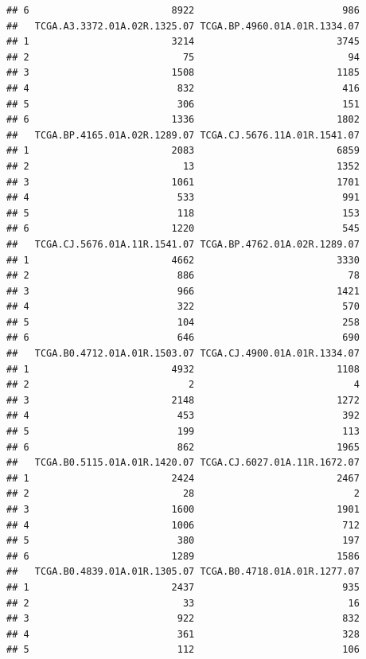 \documentclass[
]{article}
\begin{document}
\begin{verbatim}
## 6                         8922                          986
##   TCGA.A3.3372.01A.02R.1325.07 TCGA.BP.4960.01A.01R.1334.07
## 1                         3214                         3745
## 2                           75                           94
## 3                         1508                         1185
## 4                          832                          416
## 5                          306                          151
## 6                         1336                         1802
##   TCGA.BP.4165.01A.02R.1289.07 TCGA.CJ.5676.11A.01R.1541.07
## 1                         2083                         6859
## 2                           13                         1352
## 3                         1061                         1701
## 4                          533                          991
## 5                          118                          153
## 6                         1220                          545
##   TCGA.CJ.5676.01A.11R.1541.07 TCGA.BP.4762.01A.02R.1289.07
## 1                         4662                         3330
## 2                          886                           78
## 3                          966                         1421
## 4                          322                          570
## 5                          104                          258
## 6                          646                          690
##   TCGA.B0.4712.01A.01R.1503.07 TCGA.CJ.4900.01A.01R.1334.07
## 1                         4932                         1108
## 2                            2                            4
## 3                         2148                         1272
## 4                          453                          392
## 5                          199                          113
## 6                          862                         1965
##   TCGA.B0.5115.01A.01R.1420.07 TCGA.CJ.6027.01A.11R.1672.07
## 1                         2424                         2467
## 2                           28                            2
## 3                         1600                         1901
## 4                         1006                          712
## 5                          380                          197
## 6                         1289                         1586
##   TCGA.B0.4839.01A.01R.1305.07 TCGA.B0.4718.01A.01R.1277.07
## 1                         2437                          935
## 2                           33                           16
## 3                          922                          832
## 4                          361                          328
## 5                          112                          106

\end{verbatim}
\end{document}
